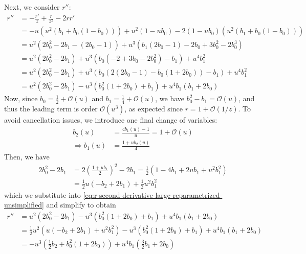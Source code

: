 \documentclass{article}
\begin{document}
Next, we consider $r''$:
%
\begin{align}
  r'' & = -\frac{r'}{z} + \frac{r}{z^2} - 2 r r'                                                                                                        \\
      & = -u(u^2 (b_1 + b_0(1-b_0))) + u^2 (1 - u b_0) - 2 (1 - u b_0) (u^2 (b_1 + b_0(1-b_0)))                                                         \\
      & = u^2 (2 b_0^2 - 2 b_1 - (2 b_0 - 1)) + u^3 (b_1 (2 b_0 - 1) - 2 b_0 + 3b_0^2 - 2 b_0^3)                                                        \\
      & = u^2 (2 b_0^2 - 2 b_1) + u^3 (b_0 (- 2 + 3b_0 - 2 b_0^2) - b_1) + u^4 b_1^2                                                                    \\
      & = u^2 (2 b_0^2 - 2 b_1) + u^3 (b_0 (2(2 b_0 - 1) - b_0 (1 + 2 b_0)) - b_1) + u^4 b_1^2                                                          \\
      & = u^2 (2 b_0^2 - 2 b_1) - u^3 (b_0^2 (1 + 2 b_0) + b_1) + u^4 b_1(b_1 + 2 b_0) \label{eq:r-second-derivative-large-reparametrized-unsimplified}
\end{align}
%
Now, since $b_0 = \frac{1}{2} + \mathcal{O}(u)$ and $b_1 = \frac{1}{4} + \mathcal{O}(u)$, we have $b_0^2 - b_1 = \mathcal{O}(u)$, and thus the leading term is order $\mathcal{O}(u^3)$, as expected since $r = 1 + \mathcal{O}(1/z)$.
To avoid cancellation issues, we introduce one final change of variables:
%
\begin{align}
  b_2(u)             & = \frac{4 b_1(u) - 1}{u} = 1 + \mathcal{O}(u) \label{eq:b2-reparametrized} \\
  \Rightarrow b_1(u) & = \frac{1 + u b_2(u)}{4} \label{eq:b1-reparametrized}
\end{align}
%
Then, we have
%
\begin{align}
  2 b_0^2 - 2 b_1 & = 2(\frac{1 + u b_1}{2})^2 - 2 b_1 = \frac{1}{2} (1 - 4 b_1 + 2 u b_1 + u^2 b_1^2) \\
                  & = \frac{1}{2} u (-b_2 + 2 b_1) + \frac{1}{2} u^2 b_1^2
\end{align}
%
which we substitute into \cref{eq:r-second-derivative-large-reparametrized-unsimplified} and simplify to obtain
%
\begin{align}
  r'' & = u^2 (2 b_0^2 - 2 b_1) - u^3 (b_0^2 (1 + 2 b_0) + b_1) + u^4 b_1(b_1 + 2 b_0)                          \\
      & = \frac{1}{2} u^2 (u (-b_2 + 2 b_1) + u^2 b_1^2) - u^3 (b_0^2 (1 + 2 b_0) + b_1) + u^4 b_1(b_1 + 2 b_0) \\
      & = -u^3 (\frac{1}{2}b_2 + b_0^2 (1 + 2 b_0)) + u^4 b_1 (\frac{3}{2} b_1 + 2 b_0)
\end{align}
\end{document}
